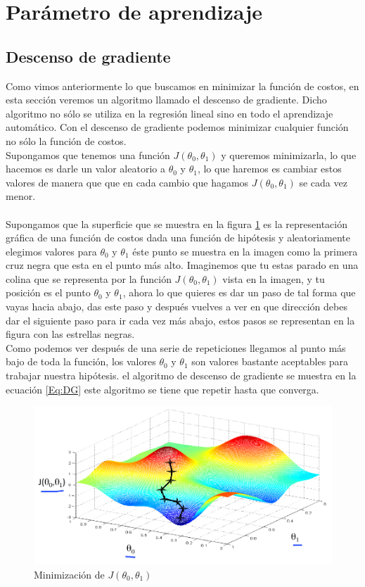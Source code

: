 \documentclass{report}
\begin{document}
\section{Parámetro de aprendizaje}
\subsection{Descenso de gradiente}
Como vimos anteriormente lo que buscamos en minimizar la función de costos, en esta sección veremos un algoritmo llamado el descenso de gradiente. Dicho algoritmo no sólo se utiliza en la regresión lineal sino en todo el aprendizaje automático. Con el descenso de gradiente podemos minimizar cualquier función no sólo la función de costos.\\Supongamos que tenemos una función $J(\theta_0,\theta_1)$ y queremos minimizarla, lo que hacemos es darle un valor aleatorio a $\theta_0$ y $\theta_1$, lo que haremos es cambiar estos valores de manera que que en cada cambio que hagamos $J(\theta_0,\theta_1)$ se cada vez menor.\\\\Supongamos que la superficie que se muestra en la figura \ref{Fig:GD1} es la representación gráfica de una función de costos dada una función de hipótesis y aleatoriamente elegimos valores para $\theta_0$ y $\theta_1$ éste punto se muestra en la imagen como la primera cruz negra que esta en el punto más alto. Imaginemos que tu estas parado en una colina que se representa por la función $J(\theta_0,\theta_1)$ vista en la imagen, y tu posición es el punto $\theta_0$ y $\theta_1$, ahora lo que quieres es dar un paso de tal forma que vayas hacia abajo, das este paso y después vuelves a ver en que dirección debes dar el siguiente paso para ir cada vez más abajo, estos pasos se representan en la figura con las estrellas negras.\\ Como podemos ver después de una serie de repeticiones llegamos al punto más bajo de toda la función, los valores $\theta_0$ y $\theta_1$ son valores bastante aceptables para trabajar nuestra hipótesis. el algoritmo de descenso de gradiente se muestra en la ecuación \ref{Eq:DG} este algoritmo se tiene que repetir hasta que converga.
\begin{figure}[h]
	\centering
	\includegraphics[scale=0.5]{img/GD1}
	\caption{Minimización de $J(\theta_0,\theta_1)$}
	\label{Fig:GD1}	
\end{figure}
\end{document}
